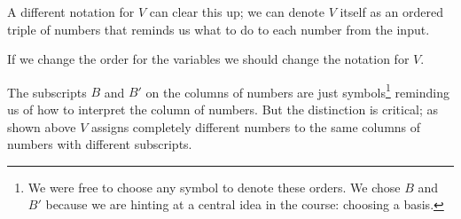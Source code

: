 \begin{example}
A different notation for $V$ can clear this up; 
we can denote $V$ itself as an ordered triple of numbers that reminds 
us what to do to each number from the input.
\begin{center}
\end{center}
If we change the order for the variables we should change the notation for $V$.
\begin{center}
\end{center}
The  subscripts $B$ and $B'$ on the columns of numbers are just symbols\footnote{We were free to choose any symbol to denote these orders. We chose $B$ and $B'$ because we are hinting at a central idea in the course: choosing a basis.} reminding us of how to interpret the column of numbers.
But the distinction is critical; as shown above
$V$ assigns completely different numbers to the same  columns of numbers with different subscripts. 


\end{example}
